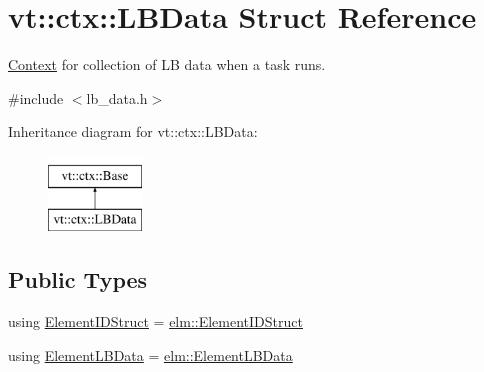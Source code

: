 \hypertarget{structvt_1_1ctx_1_1_l_b_data}{}\section{vt\+:\+:ctx\+:\+:L\+B\+Data Struct Reference}
\label{structvt_1_1ctx_1_1_l_b_data}


\hyperlink{structvt_1_1ctx_1_1_context}{Context} for collection of LB data when a task runs.  




{\ttfamily \#include $<$lb\+\_\+data.\+h$>$}

Inheritance diagram for vt\+:\+:ctx\+:\+:L\+B\+Data\+:\begin{figure}[H]
\begin{center}
\leavevmode
\includegraphics[height=2.000000cm]{structvt_1_1ctx_1_1_l_b_data}
\end{center}
\end{figure}
\subsection*{Public Types}
\begin{DoxyCompactItemize}
\item 
using \hyperlink{structvt_1_1ctx_1_1_l_b_data_aad9fac05c3faf80173b273d900db6fb1}{Element\+I\+D\+Struct} = \hyperlink{structvt_1_1elm_1_1_element_i_d_struct}{elm\+::\+Element\+I\+D\+Struct}
\item 
using \hyperlink{structvt_1_1ctx_1_1_l_b_data_a11f1aeb75c01ae0c77d96f94ce1994bb}{Element\+L\+B\+Data} = \hyperlink{structvt_1_1elm_1_1_element_l_b_data}{elm\+::\+Element\+L\+B\+Data}
\end{DoxyCompactItemize}
